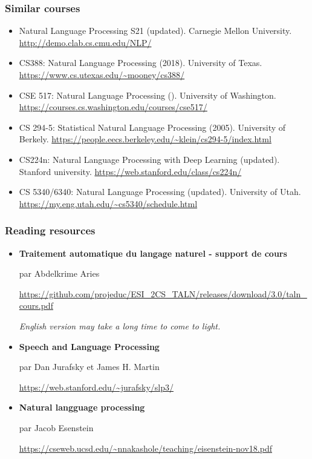 \documentclass{beamer}
\begin{document}
\begin{frame}
	\frametitle{Similar courses}
	
	\begin{itemize}
		
		\item Natural Language Processing S21 (updated).
		Carnegie Mellon University. 
		\url{http://demo.clab.cs.cmu.edu/NLP/}
		
		\item CS388: Natural Language Processing (2018). 
		University of Texas. 
		\url{https://www.cs.utexas.edu/~mooney/cs388/}
		
		\item CSE 517: Natural Language Processing ().
		University of Washington.
		\url{https://courses.cs.washington.edu/courses/cse517/}
		
		\item CS 294-5: Statistical Natural Language Processing (2005). 
		University of Berkely. 
		\url{https://people.eecs.berkeley.edu/~klein/cs294-5/index.html}
		
		\item CS224n: Natural Language Processing with Deep Learning (updated).
		Stanford university.
		\url{https://web.stanford.edu/class/cs224n/}
		
		\item CS 5340/6340: Natural Language Processing (updated). 
		University of Utah.
		\url{https://my.eng.utah.edu/~cs5340/schedule.html}
		
	\end{itemize}
	
\end{frame}

\begin{frame}
	\frametitle{Reading resources}
	
	\begin{itemize}
		
		\item \textbf{Traitement automatique du langage naturel - support de cours}
		
		par Abdelkrime Aries
		
		\url{https://github.com/projeduc/ESI_2CS_TALN/releases/download/3.0/taln_cours.pdf}
		
		\textit{\color{red}English version may take a long time to come to light.}
		
		\item \textbf{Speech and Language Processing} 
		
		par Dan Jurafsky et James H. Martin
		
		\url{https://web.stanford.edu/~jurafsky/slp3/}
		
		\item \textbf{Natural langguage processing}
		
		par Jacob Esenstein 
		
		\url{https://cseweb.ucsd.edu/~nnakashole/teaching/eisenstein-nov18.pdf}
		
		
	\end{itemize}
	
\end{frame}
\end{document}
